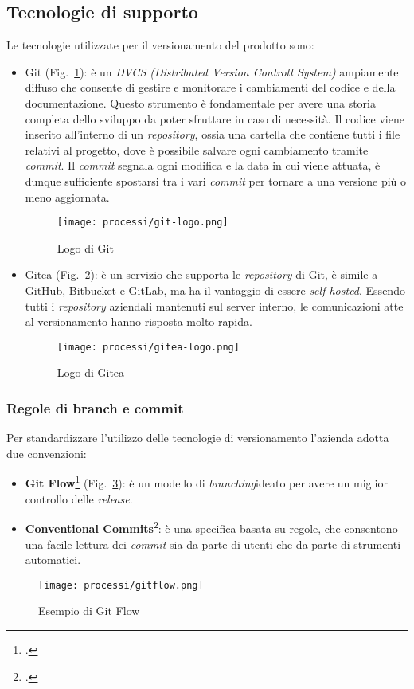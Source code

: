 \subsection{Tecnologie di supporto}
Le tecnologie utilizzate per il versionamento del prodotto sono:
\begin{itemize}
    \item Git (Fig.~\ref{fig:logo-git}): è un \emph{DVCS (Distributed Version Controll System)} ampiamente diffuso che consente di gestire e monitorare i cambiamenti del codice e della documentazione. Questo strumento è fondamentale per avere una storia completa dello sviluppo da poter sfruttare in caso di necessità. Il codice viene inserito all'interno di un \emph{repository}, ossia una cartella che contiene tutti i file relativi al progetto, dove è possibile salvare ogni cambiamento tramite \emph{commit}. Il \emph{commit} segnala ogni modifica e la data in cui viene attuata, è dunque sufficiente spostarsi tra i vari \emph{commit} per tornare a una versione più o meno aggiornata.  
    
    \begin{figure}[!h] 
        \centering 
        \texttt{[image: processi/git-logo.png]} 
        \caption{Logo di Git}
        \label{fig:logo-git}
      \end{figure}

    \item Gitea (Fig.~\ref{fig:logo-gitea}): è un servizio che supporta le \emph{repository} di Git, è simile a GitHub, Bitbucket e GitLab, ma ha il vantaggio di essere \emph{self hosted}\glsfirstoccur. 
    Essendo tutti i \emph{repository} aziendali mantenuti sul server interno, le comunicazioni atte al versionamento hanno risposta molto rapida.

    \begin{figure}[!h] 
        \centering 
        \texttt{[image: processi/gitea-logo.png]} 
        \caption{Logo di Gitea}
        \label{fig:logo-gitea}
      \end{figure}
\end{itemize}

\subsubsection{Regole di branch e commit}
Per standardizzare l'utilizzo delle tecnologie di versionamento l'azienda adotta due convenzioni:
\begin{itemize}
    \item \textbf{Git Flow}\footcite{site:gitflow} (Fig.~\ref{fig:schema-gitflow}): è un modello di \emph{branching}\glsfirstoccur ideato per avere un miglior controllo delle \emph{release}.
    \item \textbf{Conventional Commits}\footcite{site:commits}: è una specifica basata su regole, che consentono una facile lettura dei \emph{commit} sia da parte di utenti che da parte di strumenti automatici. 
\end{itemize}

\begin{figure}[!h] 
    \centering 
    \texttt{[image: processi/gitflow.png]} 
    \caption{Esempio di Git Flow}
    \label{fig:schema-gitflow}
  \end{figure}

  